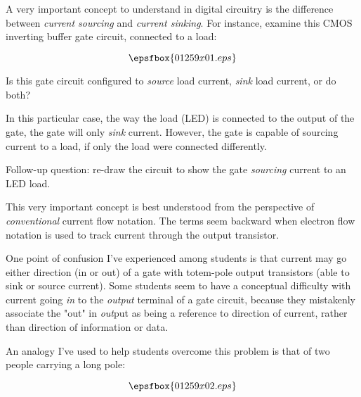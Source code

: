 

A very important concept to understand in digital circuitry is the difference between {\it current sourcing} and {\it current sinking}.  For instance, examine this CMOS inverting buffer gate circuit, connected to a load:

$$\epsfbox{01259x01.eps}$$

Is this gate circuit configured to {\it source} load current, {\it sink} load current, or do both?







In this particular case, the way the load (LED) is connected to the output of the gate, the gate will only {\it sink} current.  However, the gate is capable of sourcing current to a load, if only the load were connected differently.

\vskip 10pt

Follow-up question: re-draw the circuit to show the gate {\it sourcing} current to an LED load.







This very important concept is best understood from the perspective of {\it conventional} current flow notation.  The terms seem backward when electron flow notation is used to track current through the output transistor.

One point of confusion I've experienced among students is that current may go either direction (in or out) of a gate with totem-pole output transistors (able to sink or source current).  Some students seem to have a conceptual difficulty with current going {\it in} to the {\it output} terminal of a gate circuit, because they mistakenly associate the "out" in {\it out}put as being a reference to direction of current, rather than direction of information or data.

An analogy I've used to help students overcome this problem is that of two people carrying a long pole:

$$\epsfbox{01259x02.eps}$$

